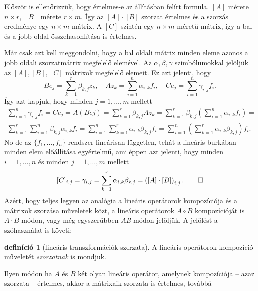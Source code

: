 \documentclass[9pt, a4paper, showtrims]{memoir}
\makeatletter
\renewenvironment{proof}[1][\proofname]
    {\par\pushQED{\qed}%
    \normalfont \topsep6\p@\@plus6\p@\relax
    \trivlist
    \item[\hskip\labelsep
        \itshape
    #1\@addpunct{:}]\ignorespaces}
    {\popQED\endtrivlist\@endpefalse}
\theoremstyle{plain}
\theoremstyle{remark}
\theoremstyle{definition}
\newtheorem{definition}[proposition]{definíció}
\makeatother
\begin{document}
\begin{proof}
    Először is ellenőrizzük, hogy értelmes-e az állításban felírt formula.
    $\left[ A \right]$ mérete $n\times r$, $\left[ B \right]$ mérete $r\times m$.
    Így az $[A]\cdot[B]$ szorzat értelmes és a szorzás eredménye egy $n\times m$ mátrix.
    A $[C]$ szintén egy $n\times m$ méretű mátrix, 
    így a bal és a jobb oldal összehasonlítása is értelmes.

    Már csak azt kell meggondolni, 
    hogy a bal oldali mátrix minden eleme azonos a jobb oldali szorzatmátrix megfelelő elemével.
    Az $\alpha,\beta,\gamma$ szimbólumokkal jelöljük az $[A],[B], [C]$ mátrixok megfelelő elemeit.
    Ez azt jelenti, hogy
    \[
        Be_j=\sum_{k=1}^r\beta_{k,j}z_k,\quad
        Az_k=\sum_{i=1}^n\alpha_{i,k}f_i,\quad
        Ce_j=\sum_{i=1}^n\gamma_{i,j}f_i.
    \]
    Így azt kapjuk, hogy minden $j=1,\dots,m$ mellett
    \begin{multline*}
        \sum_{i=1}^n\gamma_{i,j}f_i
        =
        Ce_j
        =A\left( Bej \right)
        =
        \sum_{k=1}^r\beta_{k,j}Az_k
        =
        \sum_{k=1}^r\beta_{k,j}\left( \sum_{i=1}^n\alpha_{i,k}f_i \right)
        =\\
        \sum_{k=1}^r\sum_{i=1}^n\beta_{k,j}\alpha_{i,k}f_i
        =
        \sum_{i=1}^n\sum_{k=1}^r\alpha_{i,k}\beta_{k,j}f_i
        =
        \sum_{i=1}^n\left( \sum_{k=1}^r\alpha_{i,k}\beta_{k,j} \right)f_i.
    \end{multline*}
    No de az $\{f_1,\dots,f_n\}$ rendszer lineárisan független,
    tehát a lineáris burkában minden elem előállítása egyértelmű,
    ami éppen azt jelenti, hogy minden $i=1,\dots,n$ és minden $j=1,\dots,m$ mellett
    \[
        [C]_{i,j}=\gamma_{i,j}
        =\sum_{k=1}^r\alpha_{i,k}\beta_{k,j}
        =\left( \left[ A \right]\cdot\left[ B \right] \right)_{i,j}.\qedhere
    \]
\end{proof}
Azért, hogy teljes legyen az analógia a lineáris operátorok kompozíciója és a mátrixok szorzása műveletek közt,
a lineáris operátorok $A\circ B$ kompozícióját is $A\cdot B$ módon, vagy még egyszerűbben $AB$ módon jelöljük.
A jelölést a szóhasználat is követi:
\begin{definition}[lineáris transzformációk szorzata]
    A lineáris operátorok kompozíció műveletét \emph{szorzatnak} is mondjuk.
\end{definition}
\noindent Ilyen módon ha $A$ és $B$ két olyan lineáris operátor, amelynek kompozíciója -- azaz szorzata -- értelmes,
akkor a mátrixaik szorzata is értelmes, továbbá
\end{document}
